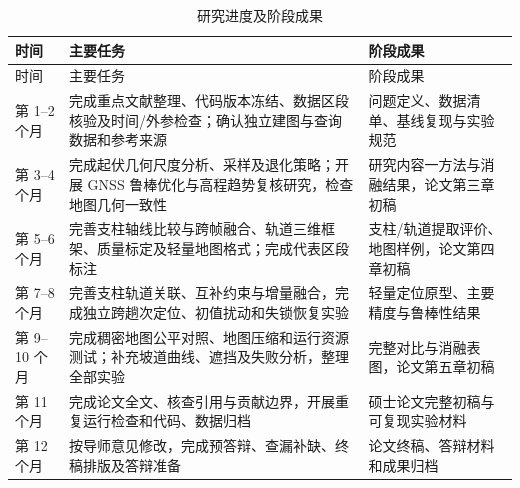 \documentclass[UTF8,a4paper,12pt,fontset=fandol]{ctexart}
\begin{document}
\begin{longtable}{p{2.3cm}p{7.3cm}p{4.0cm}}
\caption{研究进度及阶段成果}\label{tab:schedule}\\
\toprule
时间 & 主要任务 & 阶段成果\\
\midrule
\endfirsthead
\toprule
时间 & 主要任务 & 阶段成果\\
\midrule
\endhead
第 1--2 个月 &
完成重点文献整理、代码版本冻结、数据区段核验及时间/外参检查；确认独立建图与查询数据和参考来源 &
问题定义、数据清单、基线复现与实验规范\\
第 3--4 个月 &
完成起伏几何尺度分析、采样及退化策略；开展 GNSS 鲁棒优化与高程趋势复核研究，检查地图几何一致性 &
研究内容一方法与消融结果，论文第三章初稿\\
第 5--6 个月 &
完善支柱轴线比较与跨帧融合、轨道三维框架、质量标定及轻量地图格式；完成代表区段标注 &
支柱/轨道提取评价、地图样例，论文第四章初稿\\
第 7--8 个月 &
完善支柱轨道关联、互补约束与增量融合，完成独立跨趟次定位、初值扰动和失锁恢复实验 &
轻量定位原型、主要精度与鲁棒性结果\\
第 9--10 个月 &
完成稠密地图公平对照、地图压缩和运行资源测试；补充坡道曲线、遮挡及失败分析，整理全部实验 &
完整对比与消融表图，论文第五章初稿\\
第 11 个月 &
完成论文全文、核查引用与贡献边界，开展重复运行检查和代码、数据归档 &
硕士论文完整初稿与可复现实验材料\\
第 12 个月 &
按导师意见修改，完成预答辩、查漏补缺、终稿排版及答辩准备 &
论文终稿、答辩材料和成果归档\\
\bottomrule
\end{longtable}
\end{document}
